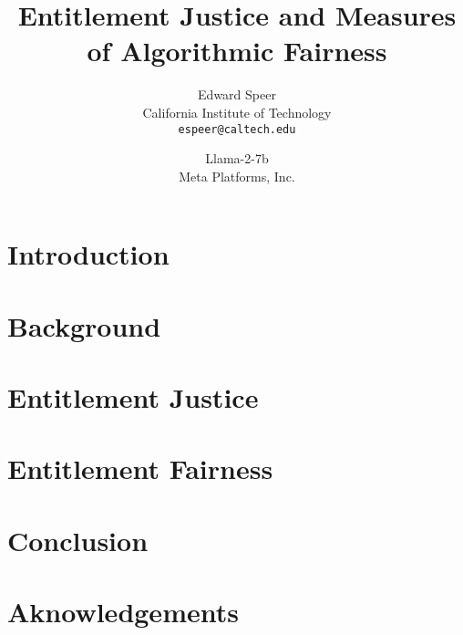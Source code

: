 \documentclass[11pt, a4paper, hyphens]{article}
\title{Entitlement Justice and Measures of Algorithmic Fairness}
\author{%
  Edward Speer
  \\
  California Institute of Technology\\
  \texttt{espeer@caltech.edu} \\
   \and
  Llama-2-7b \\
  Meta Platforms, Inc. \\
}
\date{\monthyeardate}
\begin{document}
\maketitle

\begin{abstract}
    
\end{abstract}

\section{Introduction}\label{sec:introduction}


\section{Background}\label{sec:background}


\section{Entitlement Justice}\label{sec:entitlement-justice}


\section{Entitlement Fairness}\label{sec:entitlement-fairness}


\section{Conclusion}\label{sec:conclusion}


\section*{Aknowledgements}\label{sec:acknowledgements}


\end{document}
